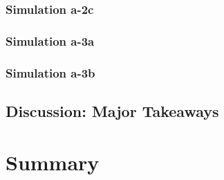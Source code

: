 \subsubsection{Simulation a-2c}

\subsubsection{Simulation a-3a}

\subsubsection{Simulation a-3b}

\subsection{Discussion: Major Takeaways}

\section{Summary}

